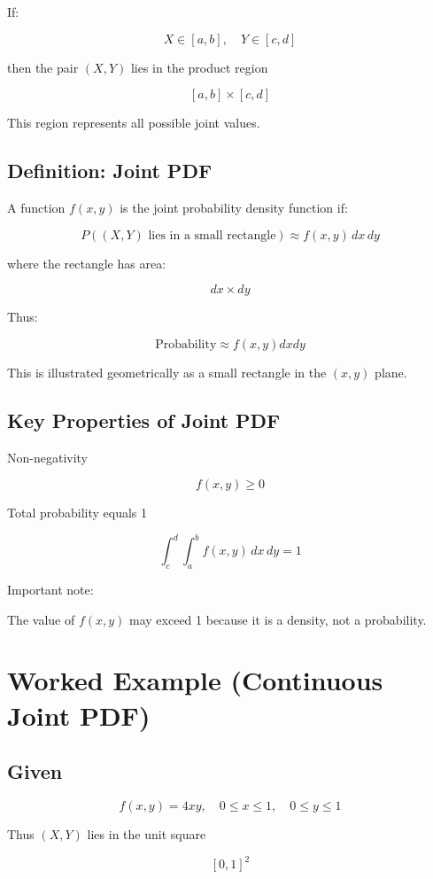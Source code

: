 \documentclass[12pt]{article}
\begin{document}
If:

\[
X \in [a,b], \quad Y \in [c,d]
\]

then the pair $(X,Y)$ lies in the product region

\[
[a,b] \times [c,d]
\]

This region represents all possible joint values.

\subsection*{Definition: Joint PDF}

A function $f(x,y)$ is the joint probability density function if:

\[
P((X,Y) \text{ lies in a small rectangle}) \approx f(x,y)\,dx\,dy
\]

where the rectangle has area:

\[
dx \times dy
\]

Thus:

\[
\text{Probability} \approx f(x,y)dxdy
\]

This is illustrated geometrically as a small rectangle in the $(x,y)$ plane.

\subsection*{Key Properties of Joint PDF}

Non-negativity

\[
f(x,y) \ge 0
\]

Total probability equals 1

\[
\int_{c}^{d}\int_{a}^{b} f(x,y)\,dx\,dy = 1
\]

Important note:

The value of $f(x,y)$ may exceed 1 because it is a density, not a probability.

\section{Worked Example (Continuous Joint PDF)}

\subsection*{Given}

\[
f(x,y)=4xy, \quad 0 \le x \le 1, \quad 0 \le y \le 1
\]

Thus $(X,Y)$ lies in the unit square

\[
[0,1]^2
\]
\end{document}
